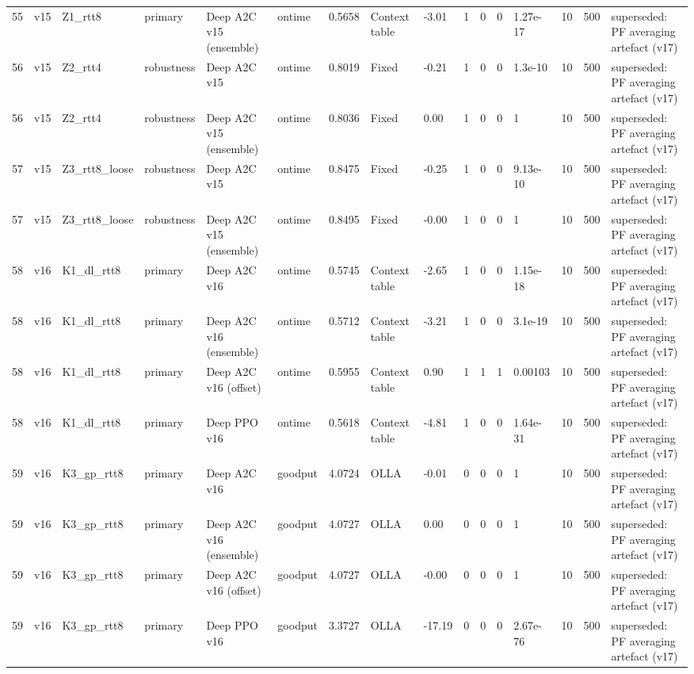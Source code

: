 \documentclass[10pt]{article}
\begin{document}
\begin{landscape}
\begin{longtable}{@{}llllllllllllllll@{}}
55 & v15 & Z1\_rtt8 & primary & Deep A2C v15 (ensemble) & ontime & 0.5658 & Context table & -3.01 & 1 & 0 & 0 & 1.27e-17 & 10 & 500 & superseded: PF averaging artefact (v17) \\
56 & v15 & Z2\_rtt4 & robustness & Deep A2C v15 & ontime & 0.8019 & Fixed & -0.21 & 1 & 0 & 0 & 1.3e-10 & 10 & 500 & superseded: PF averaging artefact (v17) \\
56 & v15 & Z2\_rtt4 & robustness & Deep A2C v15 (ensemble) & ontime & 0.8036 & Fixed & 0.00 & 1 & 0 & 0 & 1 & 10 & 500 & superseded: PF averaging artefact (v17) \\
57 & v15 & Z3\_rtt8\_loose & robustness & Deep A2C v15 & ontime & 0.8475 & Fixed & -0.25 & 1 & 0 & 0 & 9.13e-10 & 10 & 500 & superseded: PF averaging artefact (v17) \\
57 & v15 & Z3\_rtt8\_loose & robustness & Deep A2C v15 (ensemble) & ontime & 0.8495 & Fixed & -0.00 & 1 & 0 & 0 & 1 & 10 & 500 & superseded: PF averaging artefact (v17) \\
58 & v16 & K1\_dl\_rtt8 & primary & Deep A2C v16 & ontime & 0.5745 & Context table & -2.65 & 1 & 0 & 0 & 1.15e-18 & 10 & 500 & superseded: PF averaging artefact (v17) \\
58 & v16 & K1\_dl\_rtt8 & primary & Deep A2C v16 (ensemble) & ontime & 0.5712 & Context table & -3.21 & 1 & 0 & 0 & 3.1e-19 & 10 & 500 & superseded: PF averaging artefact (v17) \\
58 & v16 & K1\_dl\_rtt8 & primary & Deep A2C v16 (offset) & ontime & 0.5955 & Context table & 0.90 & 1 & 1 & 1 & 0.00103 & 10 & 500 & superseded: PF averaging artefact (v17) \\
58 & v16 & K1\_dl\_rtt8 & primary & Deep PPO v16 & ontime & 0.5618 & Context table & -4.81 & 1 & 0 & 0 & 1.64e-31 & 10 & 500 & superseded: PF averaging artefact (v17) \\
59 & v16 & K3\_gp\_rtt8 & primary & Deep A2C v16 & goodput & 4.0724 & OLLA & -0.01 & 0 & 0 & 0 & 1 & 10 & 500 & superseded: PF averaging artefact (v17) \\
59 & v16 & K3\_gp\_rtt8 & primary & Deep A2C v16 (ensemble) & goodput & 4.0727 & OLLA & 0.00 & 0 & 0 & 0 & 1 & 10 & 500 & superseded: PF averaging artefact (v17) \\
59 & v16 & K3\_gp\_rtt8 & primary & Deep A2C v16 (offset) & goodput & 4.0727 & OLLA & -0.00 & 0 & 0 & 0 & 1 & 10 & 500 & superseded: PF averaging artefact (v17) \\
59 & v16 & K3\_gp\_rtt8 & primary & Deep PPO v16 & goodput & 3.3727 & OLLA & -17.19 & 0 & 0 & 0 & 2.67e-76 & 10 & 500 & superseded: PF averaging artefact (v17) \\

\end{longtable}
\end{landscape}
\end{document}

